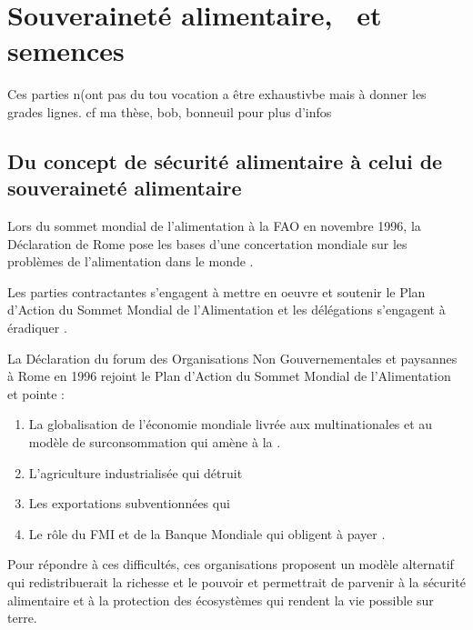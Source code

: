 \section{Souveraineté alimentaire, \agec~et semences}

Ces parties n(ont pas du tou vocation a être exhaustivbe mais à donner les grades lignes.
cf ma thèse, bob, bonneuil pour plus d'infos


\subsection{Du concept de sécurité alimentaire à celui de souveraineté alimentaire}

Lors du sommet mondial de l'alimentation à la FAO en novembre 1996, la Déclaration de Rome pose les bases d'une concertation mondiale sur les problèmes de l'alimentation dans le monde \cite{fao_declaration_1996}.

Les parties contractantes s'engagent à mettre en oeuvre et soutenir le Plan d’Action du Sommet Mondial de l’Alimentation et les délégations s'engagent à éradiquer .

La Déclaration du forum des Organisations Non Gouvernementales et paysannes à Rome en 1996 rejoint le Plan d’Action du Sommet Mondial de l’Alimentation et pointe  : 
\begin{enumerate}
\item La globalisation de l'économie mondiale livrée aux multinationales et au modèle de surconsommation qui amène à la .
\item L'agriculture industrialisée qui détruit 
\item Les exportations subventionnées qui %
\item Le rôle du FMI et de la Banque Mondiale qui obligent  à payer .
\end{enumerate}

Pour répondre à ces difficultés, ces organisations proposent un modèle alternatif  qui redistribuerait la richesse et le pouvoir et permettrait de parvenir à la sécurité alimentaire et à la protection des écosystèmes qui rendent la vie possible sur terre.

